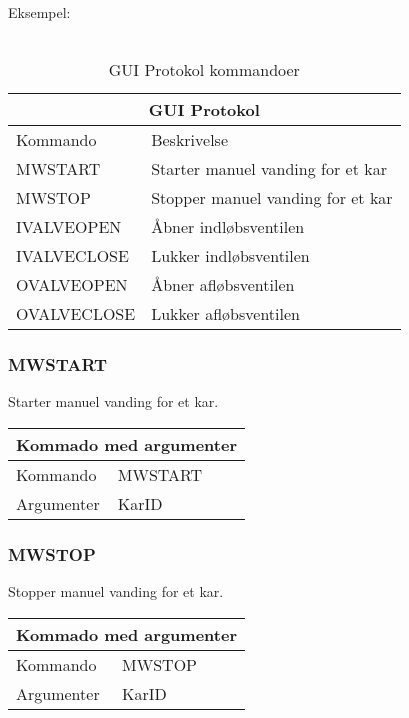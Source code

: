Eksempel:\\
\\

\begin{table}[H]
\setlength{\parindent}{12pt}
\begin{tabular}{|l|l|}\hline
\multicolumn{2}{|c|}{GUI Protokol\cellcolor[gray]{0.7}}\\\hline
Kommando & Beskrivelse \\\hline
MWSTART 		& Starter manuel vanding for et kar \\\hline 
MWSTOP  		& Stopper manuel vanding for et kar \\\hline 
IVALVEOPEN 		& Åbner indløbsventilen \\\hline 
IVALVECLOSE		& Lukker indløbsventilen \\\hline 
OVALVEOPEN 		& Åbner afløbsventilen \\\hline 
OVALVECLOSE		& Lukker afløbsventilen \\\hline 
\end{tabular}
\caption{GUI Protokol kommandoer}
\label{tab:GUIProtokol}
\end{table}


\subsubsection{MWSTART}
Starter manuel vanding for et kar.

\begin{table}[H]
\setlength{\parindent}{12pt}
\begin{tabular}{|l|lcc|}
\hline
\multicolumn{4}{|c|}{Kommado med argumenter}\\\hline
Kommando & MWSTART & & \\
Argumenter & KarID & & \\\hline
\end{tabular}
\end{table}


\subsubsection{MWSTOP}
Stopper manuel vanding for et kar.

\begin{table}[H]
\setlength{\parindent}{12pt}
\begin{tabular}{|l|lcc|}
\hline
\multicolumn{4}{|c|}{Kommado med argumenter}\\\hline
Kommando & MWSTOP & & \\
Argumenter & KarID & & \\\hline
\end{tabular}
\end{table}


